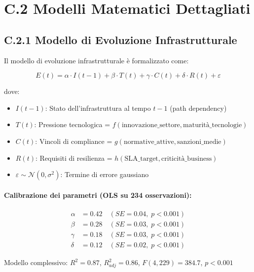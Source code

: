 \section{\texorpdfstring{\textbf{C.2 Modelli Matematici Dettagliati}}{C.2 - Modelli Matematici Dettagliati}}

\subsection{\texorpdfstring{\textbf{C.2.1 Modello di Evoluzione Infrastrutturale}}{C.2.1 - Modello di Evoluzione Infrastrutturale}}

Il modello di evoluzione infrastrutturale è formalizzato come:

\begin{equation}
E(t) = \alpha \cdot I(t-1) + \beta \cdot T(t) + \gamma \cdot C(t) + \delta \cdot R(t) + \varepsilon
\label{eq:evolution}
\end{equation}

dove:
\begin{itemize}
    \item $I(t-1)$: Stato dell'infrastruttura al tempo $t-1$ (path dependency)
    \item $T(t)$: Pressione tecnologica = $f(\text{innovazione\_settore}, \text{maturità\_tecnologie})$
    \item $C(t)$: Vincoli di compliance = $g(\text{normative\_attive}, \text{sanzioni\_medie})$
    \item $R(t)$: Requisiti di resilienza = $h(\text{SLA\_target}, \text{criticità\_business})$
    \item $\varepsilon \sim \mathcal{N}(0, \sigma^2)$: Termine di errore gaussiano
\end{itemize}

\paragraph{Calibrazione dei parametri (OLS su 234 osservazioni):}
\begin{align}
\alpha &= 0.42 \quad (SE = 0.04, \; p < 0.001) \\
\beta &= 0.28 \quad (SE = 0.03, \; p < 0.001) \\
\gamma &= 0.18 \quad (SE = 0.03, \; p < 0.001) \\
\delta &= 0.12 \quad (SE = 0.02, \; p < 0.001)
\end{align}

Modello complessivo: $R^2 = 0.87$, $R^2_{adj} = 0.86$, $F(4,229) = 384.7$, $p < 0.001$

